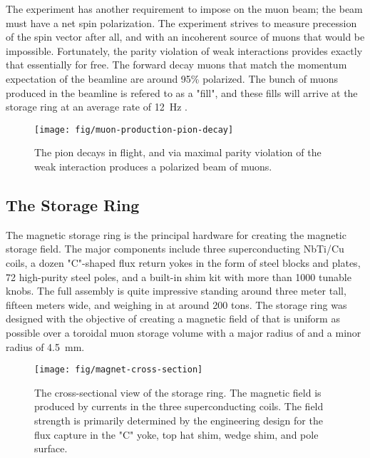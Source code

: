 The experiment has another requirement to impose on the muon beam; the beam must have a net spin polarization.  The experiment strives to measure precession of the spin vector after all, and with an incoherent source of muons that would be impossible.  Fortunately, the parity violation of weak interactions provides exactly that essentially for free.  The forward decay muons that match the momentum expectation of the beamline are around 95\% polarized.  The bunch of muons produced in the beamline is refered to as a "fill", and these fills will arrive at the storage ring at an average rate of \SI{12}{\Hz} \cite{e989-tdr}.

\begin{figure}
\label{fig:muon-production-pion-decay}
\texttt{[image: fig/muon-production-pion-decay]}
\caption{The pion decays in flight, and via maximal parity violation of the weak interaction produces a polarized beam of muons. }
\end{figure}

\subsection{The Storage Ring} \label{sec:storage-ring}

The magnetic storage ring is the principal hardware for creating the magnetic storage field.  The major components include three superconducting NbTi/Cu coils, a dozen "C"-shaped flux return yokes in the form of steel blocks and plates, 72 high-purity steel poles, and a built-in shim kit with more than 1000 tunable knobs.  The full assembly is quite impressive standing around three meter tall, fifteen meters wide, and weighing in at around 200 tons.  The storage ring was designed with the objective of creating a magnetic field of \bmagic that is uniform as possible over a toroidal muon storage volume with a major radius of \rmagic and a minor radius of \SI{4.5}{\mm}.

\begin{figure}
\texttt{[image: fig/magnet-cross-section]}
\caption{The cross-sectional view of the storage ring.  The magnetic field is produced by currents in the three superconducting coils.  The field strength is primarily determined by the engineering design for the flux capture in the "C" yoke, top hat shim, wedge shim, and pole surface.}
\label{fig:magnet-cross-section}
\end{figure}

